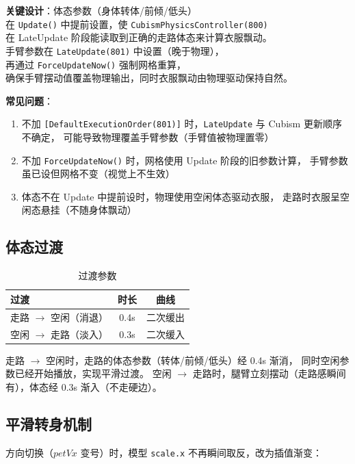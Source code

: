 \documentclass[12pt,a4paper]{ctexart}
\begin{document}
\textbf{关键设计}：体态参数（身体转体/前倾/低头）\\
在 \texttt{Update()} 中提前设置，使 \texttt{CubismPhysicsController(800)} \\
在 LateUpdate 阶段能读取到正确的走路体态来计算衣服飘动。\\
手臂参数在 \texttt{LateUpdate(801)} 中设置（晚于物理），\\
再通过 \texttt{ForceUpdateNow()} 强制网格重算，\\
确保手臂摆动值覆盖物理输出，同时衣服飘动由物理驱动保持自然。

\textbf{常见问题}：
\begin{enumerate}
    \item 不加 \texttt{[DefaultExecutionOrder(801)]} 时，\texttt{LateUpdate} 与 Cubism 更新顺序不确定，
        可能导致物理覆盖手臂参数（手臂值被物理置零）
    \item 不加 \texttt{ForceUpdateNow()} 时，网格使用 Update 阶段的旧参数计算，
        手臂参数虽已设但网格不变（视觉上不生效）
    \item 体态不在 Update 中提前设时，物理使用空闲体态驱动衣服，
        走路时衣服呈空闲态悬挂（不随身体飘动）
\end{enumerate}

\subsection{体态过渡}

\begin{table}[H]
\centering
\caption{过渡参数}
\label{tab:blend}
\begin{tabular}{lcc}
\toprule
\textbf{过渡} & \textbf{时长} & \textbf{曲线} \\
\midrule
走路 $\to$ 空闲（消退） & 0.4s & 二次缓出 \\
空闲 $\to$ 走路（淡入） & 0.3s & 二次缓入 \\
\bottomrule
\end{tabular}
\end{table}

走路 $\to$ 空闲时，走路的体态参数（转体/前倾/低头）经 0.4s 渐消，
同时空闲参数已经开始播放，实现平滑过渡。
空闲 $\to$ 走路时，腿臂立刻摆动（走路感瞬间有），体态经 0.3s 渐入（不走硬边）。

\subsection{平滑转身机制}

方向切换（$petVx$ 变号）时，模型 \texttt{scale.x} 不再瞬间取反，改为插值渐变：
\end{document}
